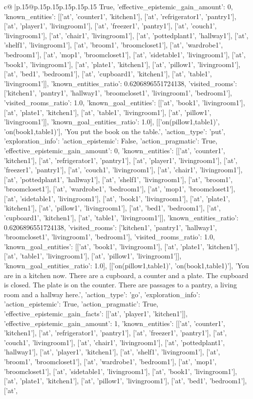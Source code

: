 \documentclass{article}
\begin{document}
{\begin{supertabular}{c@{$\;$}|p{.15\linewidth}@{}p{.15\linewidth}p{.15\linewidth}p{.15\linewidth}p{.15\linewidth}p{.15\linewidth}}
{{{True, 'effective_epistemic_gain_amount': 0, 'known_entities': [['at', 'counter1', 'kitchen1'], ['at', 'refrigerator1', 'pantry1'], ['at', 'player1', 'livingroom1'], ['at', 'freezer1', 'pantry1'], ['at', 'couch1', 'livingroom1'], ['at', 'chair1', 'livingroom1'], ['at', 'pottedplant1', 'hallway1'], ['at', 'shelf1', 'livingroom1'], ['at', 'broom1', 'broomcloset1'], ['at', 'wardrobe1', 'bedroom1'], ['at', 'mop1', 'broomcloset1'], ['at', 'sidetable1', 'livingroom1'], ['at', 'book1', 'livingroom1'], ['at', 'plate1', 'kitchen1'], ['at', 'pillow1', 'livingroom1'], ['at', 'bed1', 'bedroom1'], ['at', 'cupboard1', 'kitchen1'], ['at', 'table1', 'livingroom1']], 'known_entities_ratio': 0.6206896551724138, 'visited_rooms': ['kitchen1', 'pantry1', 'hallway1', 'broomcloset1', 'livingroom1', 'bedroom1'], 'visited_rooms_ratio': 1.0, 'known_goal_entities': [['at', 'book1', 'livingroom1'], ['at', 'plate1', 'kitchen1'], ['at', 'table1', 'livingroom1'], ['at', 'pillow1', 'livingroom1']], 'known_goal_entities_ratio': 1.0}}], [['on(pillow1,table1)', 'on(book1,table1)'], 'You put the book on the table.', {'action_type': 'put', 'exploration_info': {'action_epistemic': False, 'action_pragmatic': True, 'effective_epistemic_gain_amount': 0, 'known_entities': [['at', 'counter1', 'kitchen1'], ['at', 'refrigerator1', 'pantry1'], ['at', 'player1', 'livingroom1'], ['at', 'freezer1', 'pantry1'], ['at', 'couch1', 'livingroom1'], ['at', 'chair1', 'livingroom1'], ['at', 'pottedplant1', 'hallway1'], ['at', 'shelf1', 'livingroom1'], ['at', 'broom1', 'broomcloset1'], ['at', 'wardrobe1', 'bedroom1'], ['at', 'mop1', 'broomcloset1'], ['at', 'sidetable1', 'livingroom1'], ['at', 'book1', 'livingroom1'], ['at', 'plate1', 'kitchen1'], ['at', 'pillow1', 'livingroom1'], ['at', 'bed1', 'bedroom1'], ['at', 'cupboard1', 'kitchen1'], ['at', 'table1', 'livingroom1']], 'known_entities_ratio': 0.6206896551724138, 'visited_rooms': ['kitchen1', 'pantry1', 'hallway1', 'broomcloset1', 'livingroom1', 'bedroom1'], 'visited_rooms_ratio': 1.0, 'known_goal_entities': [['at', 'book1', 'livingroom1'], ['at', 'plate1', 'kitchen1'], ['at', 'table1', 'livingroom1'], ['at', 'pillow1', 'livingroom1']], 'known_goal_entities_ratio': 1.0}}], [['on(pillow1,table1)', 'on(book1,table1)'], 'You are in a kitchen now. There are a cupboard, a counter and a plate. The cupboard is closed. The plate is on the counter. There are passages to a pantry, a living room and a hallway here.', {'action_type': 'go', 'exploration_info': {'action_epistemic': True, 'action_pragmatic': True, 'effective_epistemic_gain_facts': [['at', 'player1', 'kitchen1']], 'effective_epistemic_gain_amount': 1, 'known_entities': [['at', 'counter1', 'kitchen1'], ['at', 'refrigerator1', 'pantry1'], ['at', 'freezer1', 'pantry1'], ['at', 'couch1', 'livingroom1'], ['at', 'chair1', 'livingroom1'], ['at', 'pottedplant1', 'hallway1'], ['at', 'player1', 'kitchen1'], ['at', 'shelf1', 'livingroom1'], ['at', 'broom1', 'broomcloset1'], ['at', 'wardrobe1', 'bedroom1'], ['at', 'mop1', 'broomcloset1'], ['at', 'sidetable1', 'livingroom1'], ['at', 'book1', 'livingroom1'], ['at', 'plate1', 'kitchen1'], ['at', 'pillow1', 'livingroom1'], ['at', 'bed1', 'bedroom1'], ['at', }}}
\end{supertabular}}
\end{document}

